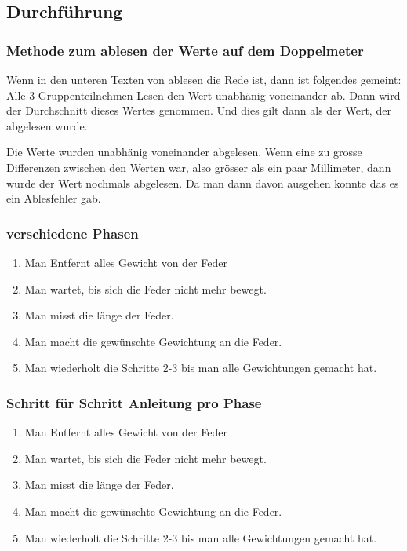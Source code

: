 \documentclass[../main.tex]{subfiles} %
\begin{document}
        \subsection{Durchführung}\label{subsec:durchfuhrung}

        \subsubsection{Methode zum ablesen der Werte auf dem Doppelmeter}\label{subsubsec:methode-zum-ablesen-der-werte-auf-dem-doppelmeter}

        Wenn in den unteren Texten von ablesen die Rede ist, dann ist folgendes gemeint:
        Alle 3 Gruppenteilnehmen Lesen den Wert unabhänig voneinander ab. Dann wird der Durchschnitt dieses Wertes genommen. Und dies gilt dann als der Wert, der abgelesen wurde.

        \begin{tcolorbox}[title=Hinweis beim Ablesen]
            Die Werte wurden unabhänig voneinander abgelesen.
            Wenn eine zu grosse Differenzen zwischen den Werten war, also grösser als ein paar Millimeter, dann wurde der Wert nochmals abgelesen.
            Da man dann davon ausgehen konnte das es ein Ablesfehler gab.
        \end{tcolorbox}


        \subsubsection{verschiedene Phasen}\label{subsubsec:schritt-fur-schritt-anleitung}
        \begin{enumerate}
            \item Man Entfernt alles Gewicht von der Feder
            \item Man wartet, bis sich die Feder nicht mehr bewegt.
            \item Man misst die länge der Feder.
            \item Man macht die gewünschte Gewichtung an die Feder.
            \item Man wiederholt die Schritte 2-3 bis man alle Gewichtungen gemacht hat.
        \end{enumerate}

        \subsubsection{Schritt für Schritt Anleitung pro Phase}\label{subsubsec:schritt-fur-schritt-anleitung2}
        \begin{enumerate}
            \item Man Entfernt alles Gewicht von der Feder
            \item Man wartet, bis sich die Feder nicht mehr bewegt.
            \item Man misst die länge der Feder.
            \item Man macht die gewünschte Gewichtung an die Feder.
            \item Man wiederholt die Schritte 2-3 bis man alle Gewichtungen gemacht hat.
        \end{enumerate}
\end{document}

